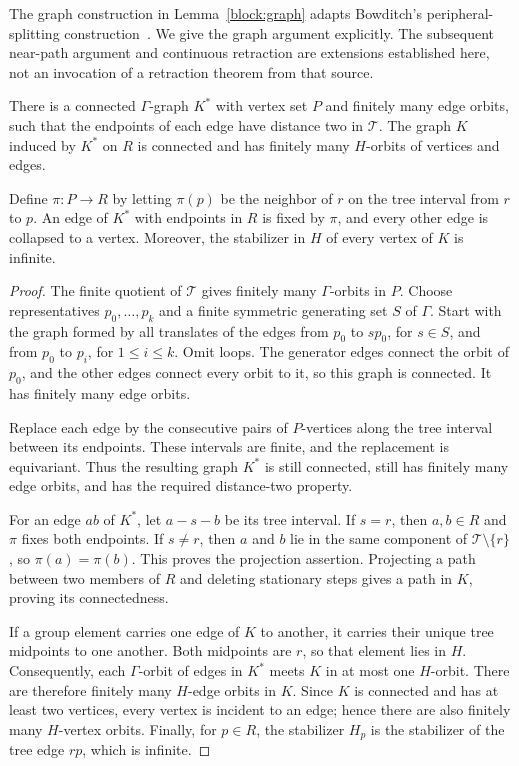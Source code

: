 The graph construction in Lemma~\ref{block:graph} adapts Bowditch's
peripheral-splitting construction~\cite[Section~4, Lemma~4.3 and its
proof]{Bowditch2001Peripheral}. We give the graph argument explicitly.
The subsequent near-path argument and continuous retraction are
extensions established here, not an invocation of a retraction theorem
from that source.

\begin{lemma}\label{block:graph}
There is a connected $\Gamma$-graph $K^*$ with vertex set $P$ and
finitely many edge orbits, such that the endpoints of each edge have
distance two in $\mathcal T$.  The graph $K$ induced by $K^*$ on $R$ is
connected and has finitely many $H$-orbits of vertices and edges.

Define $\pi:P\to R$ by letting $\pi(p)$ be the neighbor of $r$ on the
tree interval from $r$ to $p$.  An edge of $K^*$ with endpoints in $R$
is fixed by $\pi$, and every other edge is collapsed to a vertex.
Moreover, the stabilizer in $H$ of every vertex of $K$ is infinite.
\end{lemma}

\begin{proof}
The finite quotient of $\mathcal T$ gives finitely many $\Gamma$-orbits
in $P$.  Choose representatives $p_0,\ldots,p_k$ and a finite symmetric
generating set $S$ of $\Gamma$.  Start with the graph formed by all
translates of the edges from $p_0$ to $sp_0$, for $s\in S$, and from
$p_0$ to $p_i$, for $1\leq i\leq k$.  Omit loops.  The generator edges
connect the orbit of $p_0$, and the other edges connect every orbit to
it, so this graph is connected.  It has finitely many edge orbits.

Replace each edge by the consecutive pairs of $P$-vertices along the
tree interval between its endpoints.  These intervals are finite, and
the replacement is equivariant.  Thus the resulting graph $K^*$ is
still connected, still has finitely many edge orbits, and has the
required distance-two property.

For an edge $ab$ of $K^*$, let $a-s-b$ be its tree interval.  If $s=r$,
then $a,b\in R$ and $\pi$ fixes both endpoints.  If $s\ne r$, then
$a$ and $b$ lie in the same component of
$\mathcal T\setminus\{r\}$, so $\pi(a)=\pi(b)$.  This proves the
projection assertion.  Projecting a path between two members of $R$
and deleting stationary steps gives a path in $K$, proving its
connectedness.

If a group element carries one edge of $K$ to another, it carries their
unique tree midpoints to one another.  Both midpoints are $r$, so that
element lies in $H$.  Consequently, each $\Gamma$-orbit of edges in
$K^*$ meets $K$ in at most one $H$-orbit.  There are therefore finitely
many $H$-edge orbits in $K$.  Since $K$ is connected and has at least two
vertices, every vertex is incident to an edge; hence there are also
finitely many $H$-vertex orbits.  Finally, for $p\in R$, the stabilizer
$H_p$ is the stabilizer of the tree edge $rp$, which is infinite.
\end{proof}

